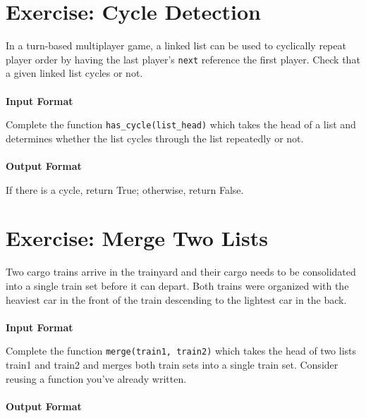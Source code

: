 \documentclass{42-en}
\begin{document}
\chapter{Exercise\exercicenumber: Cycle Detection}

\exnumber{\exercicenumber}

\makeheaderfiles
    In a turn-based multiplayer game, a linked list can be used to cyclically
    repeat player order by having the last player's \texttt{next} reference the
    first player. Check that a given linked list cycles or not.
    \\
    \\
    \textbf{Input Format}
    
    Complete the function \texttt{has\_cycle(list\_head)} which takes the head of
    a list and determines whether the list cycles through the list repeatedly
    or not.
    \\
    \\
    \textbf{Output Format}
    
    If there is a cycle, return True; otherwise, return False.

\nextexercice

\chapter{Exercise\exercicenumber: Merge Two Lists}

\exnumber{\exercicenumber}

\makeheaderfiles
    Two cargo trains arrive in the trainyard and their cargo needs to be
    consolidated into a single train set before it can depart. Both trains
    were organized with the heaviest car in the front of the train
    descending to the lightest car in the back.
    \\
    \\
    \textbf{Input Format}
    
    Complete the function \texttt{merge(train1, train2)} which takes the head
    of two lists train1 and train2 and merges both train sets into a single
    train set. Consider reusing a function you've already written.
    \\
    \\
    \textbf{Output Format}
    
\end{document}
